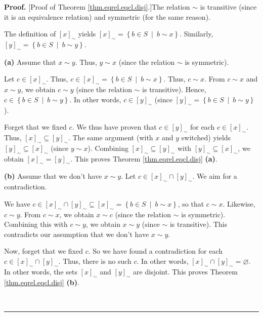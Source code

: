 \documentclass[numbers=enddot,12pt,final,onecolumn,notitlepage]{scrartcl}%
\numberwithin{exer}{subsection}
\theoremstyle{definition}
\newenvironment{proof}[1][Proof]{\noindent\textbf{#1.} }{\ \rule{0.5em}{0.5em}}
\begin{document}
\begin{proof}
[Proof of Theorem \ref{thm.eqrel.eqcl.disj}.]The relation $\sim$ is transitive
(since it is an equivalence relation) and symmetric (for the same reason).

The definition of $\left[  x\right]  _{\sim}$ yields $\left[  x\right]
_{\sim}=\left\{  b\in S\ \mid\ b\sim x\right\}  $. Similarly, $\left[
y\right]  _{\sim}=\left\{  b\in S\ \mid\ b\sim y\right\}  $.

\textbf{(a)} Assume that $x\sim y$. Thus, $y\sim x$ (since the relation $\sim$
is symmetric).

Let $c\in\left[  x\right]  _{\sim}$. Thus, $c\in\left[  x\right]  _{\sim
}=\left\{  b\in S\ \mid\ b\sim x\right\}  $. Thus, $c\sim x$. From $c\sim x$
and $x\sim y$, we obtain $c\sim y$ (since the relation $\sim$ is transitive).
Hence, $c\in\left\{  b\in S\ \mid\ b\sim y\right\}  $. In other words,
$c\in\left[  y\right]  _{\sim}$ (since $\left[  y\right]  _{\sim}=\left\{
b\in S\ \mid\ b\sim y\right\}  $).

Forget that we fixed $c$. We thus have proven that $c\in\left[  y\right]
_{\sim}$ for each $c\in\left[  x\right]  _{\sim}$. Thus, $\left[  x\right]
_{\sim}\subseteq\left[  y\right]  _{\sim}$. The same argument (with $x$ and
$y$ switched) yields $\left[  y\right]  _{\sim}\subseteq\left[  x\right]
_{\sim}$ (since $y\sim x$). Combining $\left[  x\right]  _{\sim}%
\subseteq\left[  y\right]  _{\sim}$ with $\left[  y\right]  _{\sim}%
\subseteq\left[  x\right]  _{\sim}$, we obtain $\left[  x\right]  _{\sim
}=\left[  y\right]  _{\sim}$. This proves Theorem \ref{thm.eqrel.eqcl.disj}
\textbf{(a)}.

\textbf{(b)} Assume that we don't have $x\sim y$. Let $c\in\left[  x\right]
_{\sim}\cap\left[  y\right]  _{\sim}$. We aim for a contradiction.

We have $c\in\left[  x\right]  _{\sim}\cap\left[  y\right]  _{\sim}%
\subseteq\left[  x\right]  _{\sim}=\left\{  b\in S\ \mid\ b\sim x\right\}  $,
so that $c\sim x$. Likewise, $c\sim y$. From $c\sim x$, we obtain $x\sim c$
(since the relation $\sim$ is symmetric). Combining this with $c\sim y$, we
obtain $x\sim y$ (since $\sim$ is transitive). This contradicts our assumption
that we don't have $x\sim y$.

Now, forget that we fixed $c$. So we have found a contradiction for each
$c\in\left[  x\right]  _{\sim}\cap\left[  y\right]  _{\sim}$. Thus, there is
no such $c$. In other words, $\left[  x\right]  _{\sim}\cap\left[  y\right]
_{\sim}=\varnothing$. In other words, the sets $\left[  x\right]  _{\sim}$ and
$\left[  y\right]  _{\sim}$ are disjoint. This proves Theorem
\ref{thm.eqrel.eqcl.disj} \textbf{(b)}.


\end{proof}
\end{document}
